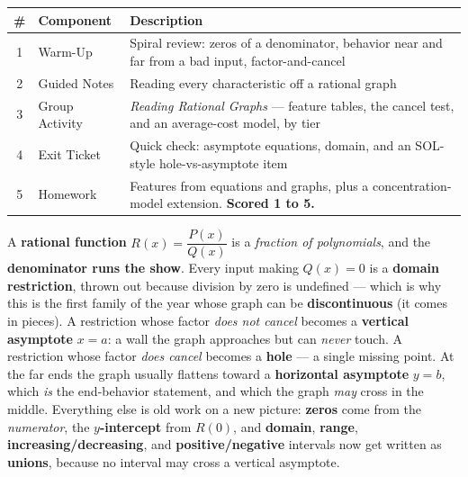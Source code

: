 \documentclass[10pt]{article}
\begin{document}
\begin{tocbox}
\small
\renewcommand{\arraystretch}{1.5}
\begin{tabularx}{\linewidth}{@{} c l X @{}}
\rowcolor{forestbg}
\textbf{\#} & \textbf{Component} & \textbf{Description} \\
\midrule
1 & Warm-Up        & Spiral review: zeros of a denominator, behavior near and far from a bad input, factor-and-cancel \\
2 & Guided Notes   & Reading every characteristic off a rational graph \\
3 & Group Activity & \emph{Reading Rational Graphs} --- feature tables, the cancel test, and an average-cost model, by tier \\
4 & Exit Ticket    & Quick check: asymptote equations, domain, and an SOL-style hole-vs-asymptote item \\
5 & Homework       & Features from equations and graphs, plus a concentration-model extension. \textbf{Scored 1 to 5.} \\
\end{tabularx}
\end{tocbox}

\vspace{0.10in}

\begin{remindbox}
\small A \textbf{rational function} $R(x)=\dfrac{P(x)}{Q(x)}$ is a \emph{fraction of polynomials}, and
the \textbf{denominator runs the show}. Every input making $Q(x)=0$ is a \textbf{domain restriction},
thrown out because division by zero is undefined --- which is why this is the first family of the year
whose graph can be \textbf{discontinuous} (it comes in pieces). A restriction whose factor
\emph{does not cancel} becomes a \textbf{vertical asymptote} $x=a$: a wall the graph approaches but can
\emph{never} touch. A restriction whose factor \emph{does cancel} becomes a \textbf{hole} --- a single
missing point. At the far ends the graph usually flattens toward a \textbf{horizontal asymptote}
$y=b$, which \emph{is} the end-behavior statement, and which the graph \emph{may} cross in the middle.
Everything else is old work on a new picture: \textbf{zeros} come from the \emph{numerator},
the \textbf{$y$-intercept} from $R(0)$, and \textbf{domain}, \textbf{range},
\textbf{increasing/decreasing}, and \textbf{positive/negative} intervals now get written as
\textbf{unions}, because no interval may cross a vertical asymptote.
\end{remindbox}
\end{document}

